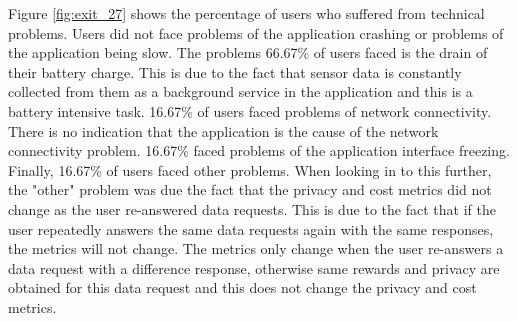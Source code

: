 Figure \ref{fig:exit_27} shows the percentage of users who suffered from technical problems. Users did not face problems of the application crashing or problems of the application being slow. The problems 66.67\% of users faced is the drain of their battery charge. This is due to the fact that sensor data is constantly collected from them as a background service in the application and this is a battery intensive task. 16.67\% of users faced problems of network connectivity. There is no indication that the application is the cause of the network connectivity problem. 16.67\% faced problems of the application interface freezing. Finally, 16.67\% of users faced other problems. When looking in to this further, the "other" problem was due the fact that the privacy and cost metrics did not change as the user re-answered data requests. This is due to the fact that if the user repeatedly answers the same data requests again with the same responses, the metrics will not change. The metrics only change when the user re-answers a data request with a difference response, otherwise same rewards and privacy are obtained for this data request and this does not change the privacy and cost metrics.
